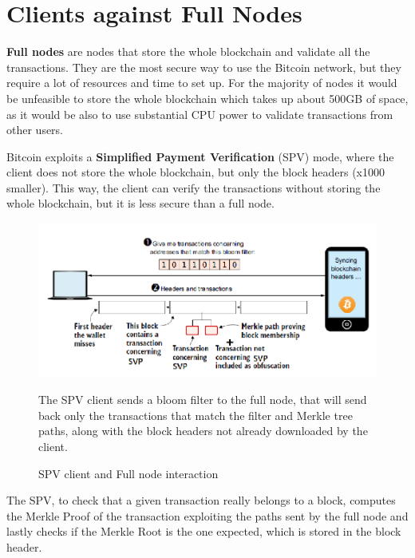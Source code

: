 \section{Clients against Full Nodes}
\textbf{Full nodes} are nodes that store the whole blockchain and validate all the transactions. They are the most secure way to use the Bitcoin network, but they require a lot of resources and time to set up.
For the majority of nodes it would be unfeasible to store the whole blockchain which takes up about 500GB of space, as it would be also to use substantial CPU power to validate transactions from other users.

Bitcoin exploits a \textbf{Simplified Payment Verification} (SPV) mode, where the client does not store the whole blockchain, but only the block headers (x1000 smaller). This way, the client can verify the transactions without storing the whole blockchain, but it is less secure than a full node.

\begin{figure}[htbp]
   \centering
   \includegraphics{images/bitcoin_spv.png}
   \caption{SPV client and Full node interaction}
   The SPV client sends a bloom filter to the full node, that will send back only the transactions that match the filter and Merkle tree paths, along with the block headers not already downloaded by the client.
   \label{fig:bitcoin_spv}
\end{figure}

The SPV, to check that a given transaction really belongs to a block, computes the Merkle Proof of the transaction exploiting the paths sent by the full node and lastly checks if the Merkle Root is the one expected, which is stored in the block header.